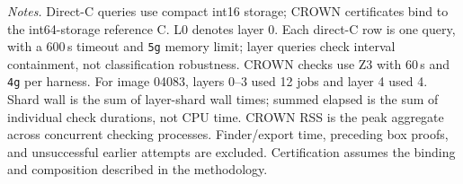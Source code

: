 \begin{table}[t]
\vspace{3pt}
\begin{minipage}{\textwidth}
\footnotesize
\textit{Notes.}
Direct-C queries use compact int16 storage; CROWN certificates bind
to the int64-storage reference C. L0 denotes layer 0.
Each direct-C row is one query, with a
600\,s timeout and \texttt{5g} memory limit; layer queries check
interval containment, not classification robustness.
CROWN checks use Z3 with 60\,s and \texttt{4g} per harness.
For image 04083, layers 0--3 used 12 jobs and layer 4 used 4.
Shard wall is the sum of layer-shard wall times; summed elapsed
is the sum of individual check durations, not CPU time.
CROWN RSS is the peak aggregate across concurrent checking processes.
Finder/export time, preceding box proofs, and unsuccessful earlier
attempts are excluded. Certification assumes the binding and
composition described in the methodology.
\end{minipage}
\end{table}
